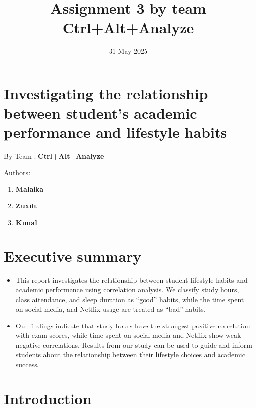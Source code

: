 \documentclass[
  11pt,
  a4paper,
]{article}
\title{Assignment 3 by team Ctrl+Alt+Analyze}
\date{31 May 2025}
\author{\sf{\Large\textbf{Malaika} \\[0.5cm]}{\Large\textbf{Kunal} \\[0.5cm]}{\Large\textbf{ZuxiLu} \\[0.5cm]}}
\makeatletter
\providecommand{\tightlist}{%
  \setlength{\itemsep}{0pt}\setlength{\parskip}{0pt}}\usepackage{longtable,booktabs,array}
\renewcommand*\contentsname{Table of contents}
\newcommand\contentsname{Table of contents}
\def\maketitle{\front{\expandafter{\@title}}{\@author}{\@organization}}
\makeatother
\begin{document}
\maketitle

\renewcommand*\contentsname{Table of contents}
{
\hypersetup{linkcolor=}
\setcounter{tocdepth}{3}
\tableofcontents
}

\newpage

\section{Investigating the relationship between student's academic
performance and lifestyle
habits}\label{investigating-the-relationship-between-students-academic-performance-and-lifestyle-habits}

By Team : \textbf{Ctrl+Alt+Analyze}

Authors:

\begin{enumerate}
\def\labelenumi{\arabic{enumi}.}
\item
  \textbf{Malaika}
\item
  \textbf{Zuxilu}
\item
  \textbf{Kunal}
\end{enumerate}

\section{Executive summary}\label{executive-summary}

\begin{itemize}
\tightlist
\item
  This report investigates the relationship between student lifestyle
  habits and academic performance using correlation analysis. We
  classify study hours, class attendance, and sleep duration as ``good''
  habits, while the time spent on social media, and Netflix usage are
  treated as ``bad'' habits.
\item
  Our findings indicate that study hours have the strongest positive
  correlation with exam scores, while time spent on social media and
  Netflix show weak negative correlations. Results from our study can be
  used to guide and inform students about the relationship between their
  lifestyle choices and academic success.
\end{itemize}

\section{Introduction}\label{introduction}
\end{document}
